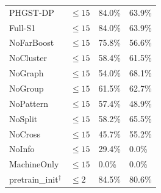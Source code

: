 \begin{table}[p]
\begin{tabularx}{\textwidth}{@{}lXXX@{}}
PHGST-DP & $\le 15$ & 84.0\% & 63.9\% \\
Full-S1 & $\le 15$ & 84.0\% & 63.9\% \\
NoFarBoost & $\le 15$ & 75.8\% & 56.6\% \\
NoCluster & $\le 15$ & 58.4\% & 61.5\% \\
NoGraph & $\le 15$ & 54.0\% & 68.1\% \\
NoGroup & $\le 15$ & 61.5\% & 62.7\% \\
NoPattern & $\le 15$ & 57.4\% & 48.9\% \\
NoSplit & $\le 15$ & 58.2\% & 65.5\% \\
NoCross & $\le 15$ & 45.7\% & 55.2\% \\
NoInfo & $\le 15$ & 29.4\% & 0.0\% \\
MachineOnly & $\le 15$ & 0.0\% & 0.0\% \\
\midrule
pretrain\_init$^\dagger$ & $\le 2$ & 84.5\% & 80.6\% \\
\bottomrule
\end{tabularx}
\end{table}

